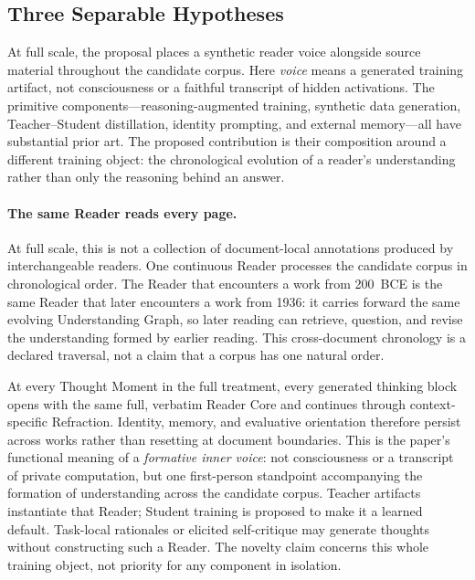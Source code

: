 \documentclass[11pt]{article}
\begin{document}
\subsection{Three Separable Hypotheses}\label{sec:three-hypotheses}

At full scale, the proposal places a synthetic reader voice alongside source
material throughout the candidate corpus. Here \emph{voice} means a generated
training artifact, not consciousness or a faithful transcript of hidden
activations. The primitive components---reasoning-augmented training, synthetic
data generation, Teacher--Student distillation, identity prompting, and external
memory---all have substantial prior art. The proposed contribution is their
composition around a different training object: the chronological evolution of
a reader's understanding rather than only the reasoning behind an answer.

\paragraph{The same Reader reads every page.} At full scale, this is not a
collection of document-local annotations produced by interchangeable readers.
One continuous Reader processes the candidate corpus in chronological order.
The Reader that encounters a work from 200~BCE is the same Reader that later
encounters a work from 1936: it carries forward the same evolving Understanding
Graph, so later reading can retrieve, question, and revise the understanding
formed by earlier reading. This cross-document chronology is a declared
traversal, not a claim that a corpus has one natural order.

At every Thought Moment in the full treatment, every generated thinking block
opens with the same full, verbatim Reader Core and continues through
context-specific Refraction. Identity, memory, and evaluative orientation
therefore persist across works rather than resetting at document boundaries.
This is the paper's functional meaning of a \emph{formative inner voice}: not
consciousness or a transcript of private computation, but one first-person
standpoint accompanying the formation of understanding across the candidate
corpus. Teacher artifacts instantiate that Reader; Student training is proposed
to make it a learned default. Task-local rationales or elicited self-critique
may generate thoughts without constructing such a Reader. The novelty claim
concerns this whole training object, not priority for any component in
isolation.
\end{document}
